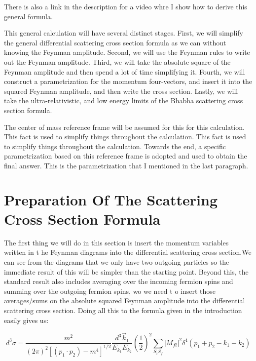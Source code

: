 \documentclass[a4]{article}
\begin{document}
    There is also a link in the description for a video whre I show how to derive this general formula.

    This general calculation will have several distinct stages. First, we will simplify the general differential scattering cross section formula as we can without knowing the Feynman amplitude.
    Second, we will use the Feynman rules to write out the Feynman amplitude. Third, we will take the absolute square of the Feynman amplitude and then spend a lot of time simplifying it. Fourth,
    we will construct a parametrization for the momentum four-vectors, and insert it into the squared Feynman amplitude, and then write the cross section. Lastly, we will take the ultra-relativistic,
    and low energy limits of the Bhabha scattering cross section formula.

    The center of mass reference frame will be assumed for this for this calculation. This fact is used to simplify things throughout the calculation. This fact is used to simplify things throughout
    the calculation. Towards the end, a specific parametrization based on this reference frame is adopted and used to obtain the final answer. This is the parametrization that I mentioned in the last
    paragraph.

    \section*{Preparation Of The Scattering Cross Section Formula}

    The first thing we will do in this section is insert the momentum variables written in t he Feynman diagrams into the differential scattering cross section.We can see from the diagrams that we only
    have two outgoing particles so the immediate result of this will be simpler than the starting point. Beyond this, the standard result also includes averaging over the incoming fermion spins and
    summing over the outgoing fermion spins, wo we need t o insert those averages/sums on the absolute squared Feynman amplitude into the differential scattering cross section. Doing all this to the
    formula given in the introduction easily gives us:

    \begin{equation}
        d^3 \sigma = \frac{m^2}{(2 \pi)^2 [(p_1 \cdot p_2) - m^4]^{1/2}} \frac{d^3 \vec{k}_1}{E_{k_1} E_{k_2}} (\frac{1}{2})^2 \sum_{S_i S_f} |M_{fi}|^2 \delta^4 (p_1 + p_2 - k_1 - k_2)
    \end{equation}
\end{document}
